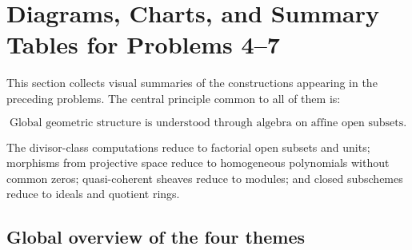 \documentclass[12pt,a4paper]{article}
\theoremstyle{notespace}
\begin{document}
\section{Diagrams, Charts, and Summary Tables for Problems 4--7}

This section collects visual summaries of the constructions appearing in the preceding problems. The central principle common to all of them is:

\[
\boxed{
	\text{Global geometric structure is understood through algebra on affine open subsets.}
}
\]

The divisor-class computations reduce to factorial open subsets and units; morphisms from projective space reduce to homogeneous polynomials without common zeros; quasi-coherent sheaves reduce to modules; and closed subschemes reduce to ideals and quotient rings.

\subsection{Global overview of the four themes}
\end{document}
